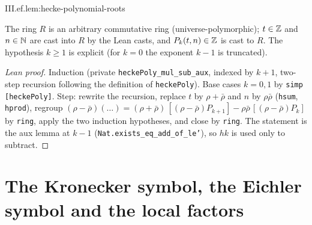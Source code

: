 \begin{lemma}
\end{lemma}
\begin{tfformal}{III.ef.lem:hecke-polynomial-roots}
\begin{tffidelity}
The ring $R$ is an arbitrary commutative ring (universe-polymorphic); $t\in\mathbb{Z}$ and $n\in\mathbb{N}$ are cast into $R$ by the Lean casts, and $P_k(t,n)\in\mathbb{Z}$ is cast to $R$. The hypothesis $k\ge1$ is explicit (for $k=0$ the exponent $k-1$ is truncated).
\end{tffidelity}
\end{tfformal}
\begin{proof}[Lean proof]
Induction (private \texttt{heckePoly\_mul\_sub\_aux}, indexed by $k+1$, two-step recursion following the definition of \texttt{heckePoly}). Base cases $k=0,1$ by \texttt{simp [heckePoly]}. Step: rewrite the recursion, replace $t$ by $\rho+\bar\rho$ and $n$ by $\rho\bar\rho$ (\texttt{hsum}, \texttt{hprod}), regroup $(\rho-\bar\rho)(\ldots)=(\rho+\bar\rho)\,[(\rho-\bar\rho)P_{k+1}]-\rho\bar\rho\,[(\rho-\bar\rho)P_k]$ by \texttt{ring}, apply the two induction hypotheses, and close by \texttt{ring}. The statement is the aux lemma at $k-1$ (\texttt{Nat.exists\_eq\_add\_of\_le'}), so $hk$ is used only to subtract.
\end{proof}

\section{The Kronecker symbol, the Eichler symbol and the local factors}\label{sec:ef-local}

